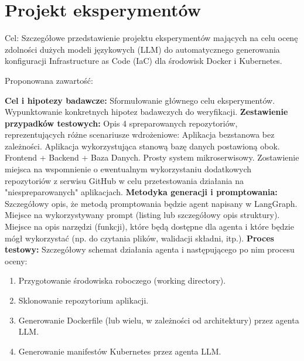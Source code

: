 \clearpage %
\section{Projekt eksperymentów}

Cel: Szczegółowe przedstawienie projektu eksperymentów mających na celu ocenę zdolności dużych modeli językowych (LLM) do automatycznego generowania konfiguracji Infrastructure as Code (IaC) dla środowisk Docker i Kubernetes.

Proponowana zawartość:

\textbf{Cel i hipotezy badawcze:}
Sformułowanie głównego celu eksperymentów.
Wypunktowanie konkretnych hipotez badawczych do weryfikacji.
\textbf{Zestawienie przypadków testowych:}
Opis 4 spreparowanych repozytoriów, reprezentujących różne scenariusze wdrożeniowe:
Aplikacja bezstanowa bez zależności.
Aplikacja wykorzystująca stanową bazę danych postawioną obok.
Frontend + Backend + Baza Danych.
Prosty system mikroserwisowy.
Zostawienie miejsca na wspomnienie o ewentualnym wykorzystaniu dodatkowych repozytoriów z serwisu GitHub w celu przetestowania działania na "niespreparowanych" aplikacjach.
\textbf{Metodyka generacji i promptowania:}
Szczegółowy opis, że metodą promptowania będzie agent napisany w LangGraph.
Miejsce na wykorzystywany prompt (listing lub szczegółowy opis struktury).
Miejsce na opis narzędzi (funkcji), które będą dostępne dla agenta i które będzie mógł wykorzystać (np. do czytania plików, walidacji składni, itp.).
\textbf{Proces testowy:}
Szczegółowy schemat działania agenta i następującego po nim procesu oceny: \begin{enumerate} \item Przygotowanie środowiska roboczego (working directory). \item Sklonowanie repozytorium aplikacji. \item Generowanie Dockerfile (lub wielu, w zależności od architektury) przez agenta LLM. \item Generowanie manifestów Kubernetes przez agenta LLM. \end{enumerate}
